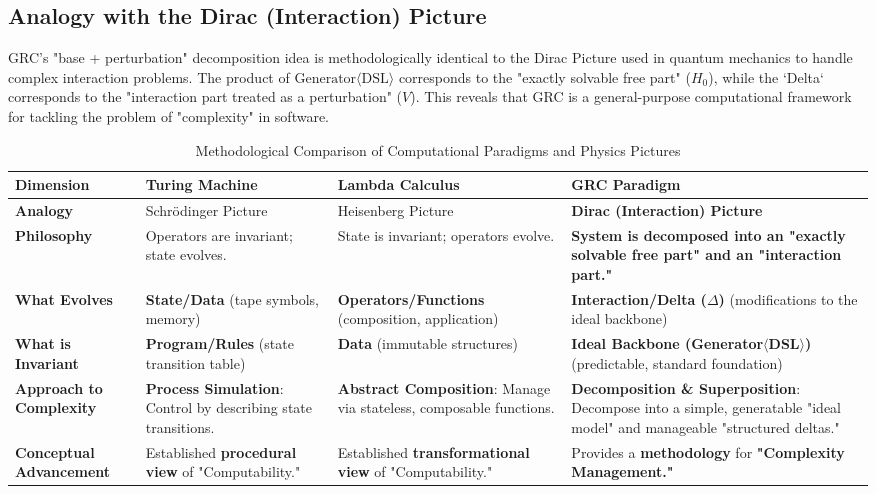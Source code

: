 \documentclass[11pt]{article}
\begin{document}
\subsection{Analogy with the Dirac (Interaction) Picture}

GRC's "base + perturbation" decomposition idea is methodologically identical to the Dirac Picture used in quantum mechanics to handle complex interaction problems. The product of $\text{Generator}\langle\text{DSL}\rangle$ corresponds to the "exactly solvable free part" ($H_0$), while the `Delta` corresponds to the "interaction part treated as a perturbation" ($V$). This reveals that GRC is a general-purpose computational framework for tackling the problem of "complexity" in software.

\begin{table}[htbp]
\centering
\caption{Methodological Comparison of Computational Paradigms and Physics Pictures}
\begin{tabularx}{\textwidth}{@{} X X X X @{}}
\toprule
\textbf{Dimension} & \textbf{Turing Machine} & \textbf{Lambda Calculus} & \textbf{GRC Paradigm} \\
\midrule
\textbf{Analogy} & Schrödinger Picture & Heisenberg Picture & \textbf{Dirac (Interaction) Picture} \\
\addlinespace
\textbf{Philosophy} & Operators are invariant; state evolves. & State is invariant; operators evolve. & \textbf{System is decomposed into an "exactly solvable free part" and an "interaction part."} \\
\addlinespace
\textbf{What Evolves} & \textbf{State/Data} (tape symbols, memory) & \textbf{Operators/Functions} (composition, application) & \textbf{Interaction/Delta ($\Delta$)} (modifications to the ideal backbone) \\
\addlinespace
\textbf{What is Invariant} & \textbf{Program/Rules} (state transition table) & \textbf{Data} (immutable structures) & \textbf{Ideal Backbone (Generator$\langle$DSL$\rangle$)} (predictable, standard foundation) \\
\addlinespace
\textbf{Approach to Complexity} & \textbf{Process Simulation}: Control by describing state transitions. & \textbf{Abstract Composition}: Manage via stateless, composable functions. & \textbf{Decomposition \& Superposition}: Decompose into a simple, generatable "ideal model" and manageable "structured deltas." \\
\addlinespace
\textbf{Conceptual Advancement} & Established \textbf{procedural view} of "Computability." & Established \textbf{transformational view} of "Computability." & Provides a \textbf{methodology} for \textbf{"Complexity Management."} \\
\bottomrule
\end{tabularx}
\label{tab:physics_analogy}
\end{table}
\end{document}
